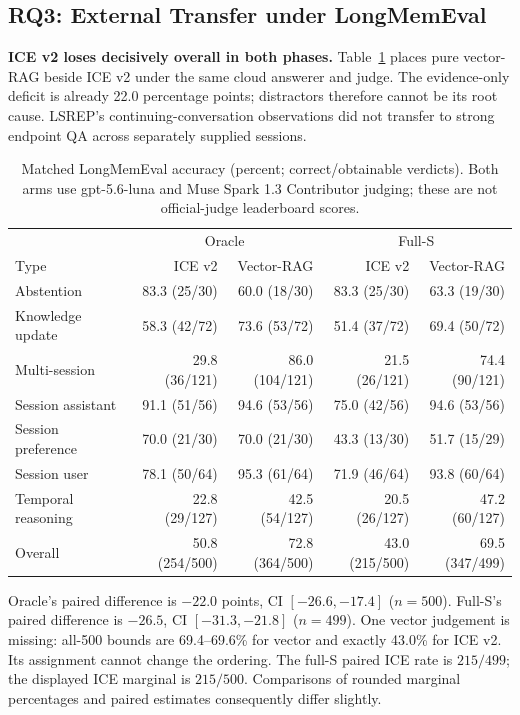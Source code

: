 \documentclass[twoside,11pt]{article}
\begin{document}
\subsection{RQ3: External Transfer under LongMemEval}
\label{sec:lme-oracle}
\textbf{ICE v2 loses decisively overall in both phases.} Table~\ref{tab:lme-oracle} places pure vector-RAG beside ICE v2 under the same cloud answerer and judge. The evidence-only deficit is already 22.0 percentage points; distractors therefore cannot be its root cause. LSREP's continuing-conversation observations did not transfer to strong endpoint QA across separately supplied sessions.

\begin{table}[tbp]
\centering\small


\begin{tabular}{@{}lrrrr@{}}\toprule
 & \multicolumn{2}{c}{Oracle} & \multicolumn{2}{c}{Full-S}\\
Type & ICE v2 & Vector-RAG & ICE v2 & Vector-RAG\\\midrule
Abstention & 83.3 (25/30) & 60.0 (18/30) & 83.3 (25/30) & 63.3 (19/30)\\
Knowledge update & 58.3 (42/72) & 73.6 (53/72) & 51.4 (37/72) & 69.4 (50/72)\\
Multi-session & 29.8 (36/121) & 86.0 (104/121) & 21.5 (26/121) & 74.4 (90/121)\\
Session assistant & 91.1 (51/56) & 94.6 (53/56) & 75.0 (42/56) & 94.6 (53/56)\\
Session preference & 70.0 (21/30) & 70.0 (21/30) & 43.3 (13/30) & 51.7 (15/29)\\
Session user & 78.1 (50/64) & 95.3 (61/64) & 71.9 (46/64) & 93.8 (60/64)\\
Temporal reasoning & 22.8 (29/127) & 42.5 (54/127) & 20.5 (26/127) & 47.2 (60/127)\\
Overall & 50.8 (254/500) & 72.8 (364/500) & 43.0 (215/500) & 69.5 (347/499)\\
\bottomrule\end{tabular}
\caption{Matched LongMemEval accuracy (percent; correct/obtainable verdicts). Both arms use gpt-5.6-luna and Muse Spark 1.3 Contributor judging; these are not official-judge leaderboard scores.}
\label{tab:lme-oracle}
\end{table}
Oracle's paired difference is $-22.0$ points, CI $[-26.6,-17.4]$ ($n=500$). Full-S's paired difference is $-26.5$, CI $[-31.3,-21.8]$ ($n=499$). One vector judgement is missing: all-500 bounds are 69.4--69.6\% for vector and exactly 43.0\% for ICE v2. Its assignment cannot change the ordering. The full-S paired ICE rate is $215/499$; the displayed ICE marginal is $215/500$. Comparisons of rounded marginal percentages and paired estimates consequently differ slightly.
\end{document}
